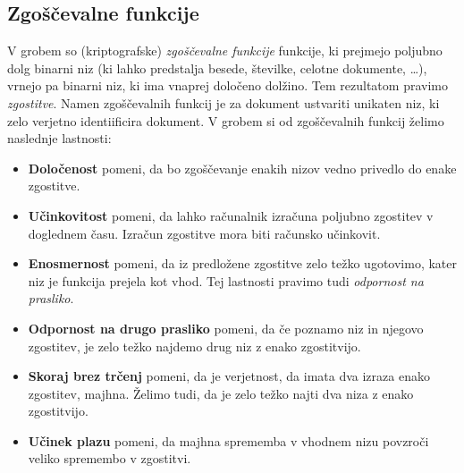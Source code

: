 \documentclass[isrm2, tisk]{fmfdelo}
\begin{document}
\subsection{Zgoščevalne funkcije}
V grobem so (kriptografske) \textit{zgoščevalne funkcije} funkcije, ki prejmejo poljubno dolg binarni 
niz (ki lahko predstalja besede, številke, celotne dokumente, \dots), vrnejo pa binarni niz, ki ima 
vnaprej določeno dolžino. Tem rezultatom pravimo \textit{zgostitve}. Namen zgoščevalnih funkcij je 
za dokument ustvariti unikaten niz, ki zelo verjetno identiificira dokument. V grobem si od zgoščevalnih 
funkcij želimo naslednje lastnosti:
\begin{itemize}
    \item \textbf{Določenost} pomeni, da bo zgoščevanje enakih nizov vedno privedlo do enake 
        zgostitve. 
    \item \textbf{Učinkovitost} pomeni, da lahko računalnik izračuna poljubno zgostitev v doglednem 
        času. Izračun zgostitve mora biti računsko učinkovit.
    \item \textbf{Enosmernost} pomeni, da iz predložene zgostitve zelo težko ugotovimo, kater niz 
        je funkcija prejela kot vhod. Tej lastnosti pravimo tudi \textit{odpornost na prasliko}.
    \item \textbf{Odpornost na drugo prasliko} pomeni, da če poznamo niz in njegovo zgostitev, 
        je zelo težko najdemo drug niz z enako zgostitvijo.
    \item \textbf{Skoraj brez trčenj} pomeni, da je verjetnost, da imata dva izraza enako zgostitev,
        majhna. Želimo tudi, da je zelo težko najti dva niza z enako zgostitvijo.
    \item \textbf{Učinek plazu} pomeni, da majhna sprememba v vhodnem nizu povzroči veliko spremembo 
        v zgostitvi.
\end{itemize}
\end{document}
